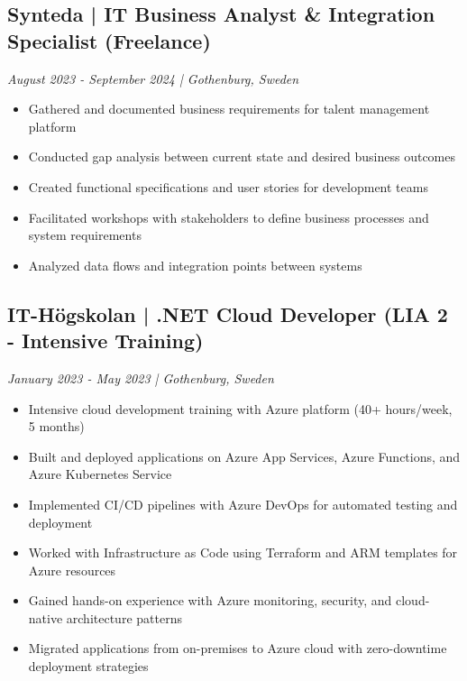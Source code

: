\documentclass[11pt,a4paper]{article}
\begin{document}
\subsection*{Synteda | IT Business Analyst \& Integration Specialist (Freelance)}
\textit{August 2023 - September 2024 | Gothenburg, Sweden}
\begin{itemize}[noitemsep]
\item Gathered and documented business requirements for talent management platform
\item Conducted gap analysis between current state and desired business outcomes
\item Created functional specifications and user stories for development teams
\item Facilitated workshops with stakeholders to define business processes and system requirements
\item Analyzed data flows and integration points between systems
\end{itemize}

\subsection*{IT-Högskolan | .NET Cloud Developer (LIA 2 - Intensive Training)}
\textit{January 2023 - May 2023 | Gothenburg, Sweden}
\begin{itemize}[noitemsep]
\item Intensive cloud development training with Azure platform (40+ hours/week, 5 months)
\item Built and deployed applications on Azure App Services, Azure Functions, and Azure Kubernetes Service
\item Implemented CI/CD pipelines with Azure DevOps for automated testing and deployment
\item Worked with Infrastructure as Code using Terraform and ARM templates for Azure resources
\item Gained hands-on experience with Azure monitoring, security, and cloud-native architecture patterns
\item Migrated applications from on-premises to Azure cloud with zero-downtime deployment strategies
\end{itemize}
\end{document}
